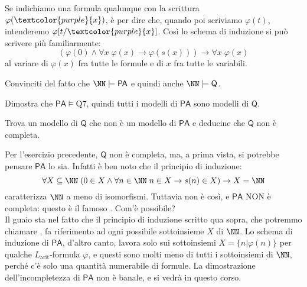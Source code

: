 \begin{notation}
    Se indichiamo una formula qualunque con la scrittura $\varphi(\textcolor{purple}{x})$, è per dire che, quando poi scriviamo $\varphi(t)$, intenderemo $\varphi[t/\textcolor{purple}{x}]$.
    Così lo schema di induzione si può scrivere più familiarmente:
    \[ (\varphi(0) \land \forall x \; \varphi(x) \to \varphi(s(x))) \to \forall x \; \varphi(x)
    \]
    al variare di $\varphi(x)$ fra tutte le formule e di $x$ fra tutte le variabili.
\end{notation}

\begin{exercise}
    Convinciti del fatto che $\NN \models \mathsf{PA}$ e quindi anche $\NN \models \mathsf{Q}$.
\end{exercise}

\begin{exercise}
    Dimostra che $\mathsf{PA} \models \text{Q7}$, quindi tutti i modelli di $\mathsf{PA}$ sono modelli di $\mathsf{Q}$.
\end{exercise}

\begin{exercise}
    Trova un modello di $\mathsf{Q}$ che non è un modello di $\mathsf{PA}$ e deducine che $\mathsf{Q}$ non è completa.
\end{exercise}

Per l'esercizio precedente, $\mathsf{Q}$ non è completa, ma, a prima vista, si potrebbe pensare $\mathsf{PA}$ lo sia. Infatti è ben noto che il principio di induzione:
\[ \forall X \subseteq \NN \; (0 \in X \land \forall n \in \NN \; n \in X \to s(n) \in X) \to X = \NN
\]
caratterizza $\NN$ a meno di isomorfismi. Tuttavia non è così, e $\mathsf{PA}$ NON è completa: questo è il famoso . Com'è possibile?\\
Il guaio sta nel fatto che il principio di induzione scritto qua sopra, che potremmo chiamare , fa riferimento ad ogni possibile sottoinsieme $X$ di $\NN$.
Lo schema di induzione di $\mathsf{PA}$, d'altro canto, lavora solo sui sottoinsiemi $X = \{n| \varphi(n)\}$ per qualche $L_{\text{arit}}$-formula $\varphi$, e questi sono molti meno di tutti i
sottoinsiemi di $\NN$, perché c'è solo una quantità numerabile di formule. La dimostrazione dell'incompletezza di $\mathsf{PA}$ non è banale, e si vedrà in questo corso.